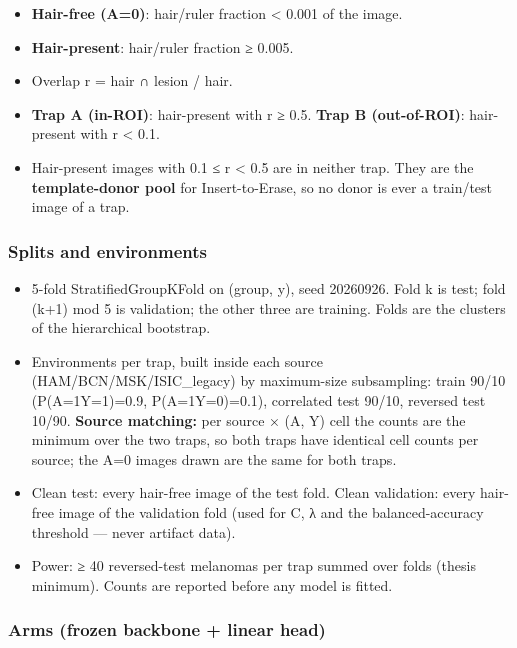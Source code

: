 {\begin{itemize}

\item
  \textbf{Hair-free (A=0)}: hair/ruler fraction \textless{} 0.001 of the image.
\item
  \textbf{Hair-present}: hair/ruler fraction ≥ 0.005.
\item
  Overlap r = \textbar hair ∩ lesion\textbar{} / \textbar hair\textbar.
\item
  \textbf{Trap A (in-ROI)}: hair-present with r ≥ 0.5. \textbf{Trap B (out-of-ROI)}: hair-present with r \textless{} 0.1.
\item
  Hair-present images with 0.1 ≤ r \textless{} 0.5 are in neither trap. They are the \textbf{template-donor pool}
  for Insert-to-Erase, so no donor is ever a train/test image of a trap.
\end{itemize}

\subsubsection{Splits and environments}\label{splits-and-environments}

\begin{itemize}

\item
  5-fold StratifiedGroupKFold on (group, y), seed 20260926. Fold k is test; fold (k+1) mod 5 is
  validation; the other three are training. Folds are the clusters of the hierarchical bootstrap.
\item
  Environments per trap, built inside each source (HAM/BCN/MSK/ISIC\_legacy) by maximum-size
  subsampling: train 90/10 (P(A=1\textbar Y=1)=0.9, P(A=1\textbar Y=0)=0.1), correlated test 90/10,
  reversed test 10/90. \textbf{Source matching:} per source × (A, Y) cell the counts are the minimum
  over the two traps, so both traps have identical cell counts per source; the A=0 images drawn
  are the same for both traps.
\item
  Clean test: every hair-free image of the test fold. Clean validation: every hair-free image of
  the validation fold (used for C, λ and the balanced-accuracy threshold --- never artifact data).
\item
  Power: ≥ 40 reversed-test melanomas per trap summed over folds (thesis minimum). Counts are
  reported before any model is fitted.
\end{itemize}

\subsubsection{Arms (frozen backbone + linear head)}\label{arms-frozen-backbone--linear-head}

}
